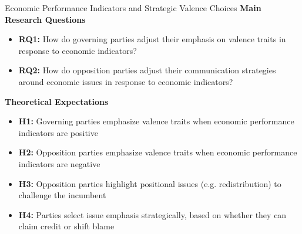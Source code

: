 \documentclass[9pt, aspectratio=169]{beamer}
\newcommand{\customcite}[1]{\textcolor{blue}{\footnotesize\parencite{#1}}}
\begin{document}
\begin{frame}{Economic Performance Indicators and Strategic Valence Choices}
    \textbf{Main Research Questions} \vspace{0.1cm}
    \begin{itemize}
        \item \textbf{RQ1:} How do governing parties adjust their emphasis on valence traits in response to economic indicators?\vspace{0.1cm}
        \item \textbf{RQ2:} How do opposition parties adjust their communication strategies around economic issues in response to economic indicators?
    \end{itemize}
    \vspace{0.4cm}
    \textbf{Theoretical Expectations} \customcite{Greene2015}\vspace{0.1cm}
\begin{itemize}
    \item \textbf{H1:} Governing parties emphasize valence traits when economic performance indicators are positive\vspace{0.1cm}
    \item \textbf{H2:} Opposition parties emphasize valence traits when economic performance indicators are negative\vspace{0.1cm}
    \item \textbf{H3:} Opposition parties highlight positional issues (e.g. redistribution) to challenge the incumbent\vspace{0.1cm}
    \item \textbf{H4:} Parties select issue emphasis strategically, based on whether they can claim credit or shift blame
\end{itemize}   
    \end{frame}
\end{document}
